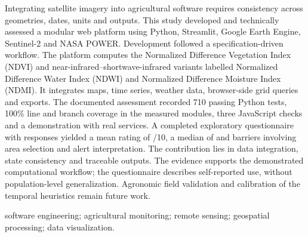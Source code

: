 \begin{Abstract}
Integrating satellite imagery into agricultural software requires consistency across geometries, dates, units and outputs. This study developed and technically assessed a modular web platform using Python, Streamlit, Google Earth Engine, Sentinel-2 and NASA POWER. Development followed a specification-driven workflow. The platform computes the Normalized Difference Vegetation Index (NDVI) and near-infrared--shortwave-infrared variants labelled Normalized Difference Water Index (NDWI) and Normalized Difference Moisture Index (NDMI). It integrates maps, time series, weather data, browser-side grid queries and exports. The documented assessment recorded 710 passing Python tests, 100\% line and branch coverage in the measured modules, three JavaScript checks and a demonstration with real services. A completed exploratory questionnaire with \UsuariosN{} responses yielded a mean rating of \UsuariosMediaEN{}/10, a median of \UsuariosMediana{} and barriers involving area selection and alert interpretation. The contribution lies in data integration, state consistency and traceable outputs. The evidence supports the demonstrated computational workflow; the questionnaire describes self-reported use, without population-level generalization. Agronomic field validation and calibration of the temporal heuristics remain future work.
\end{Abstract}
\begin{keywords}
software engineering; agricultural monitoring; remote sensing; geospatial processing; data visualization.
\end{keywords}

